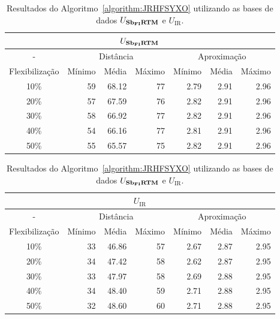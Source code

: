 \begin{table}[!htb]
  \caption{Resultados do Algoritmo~\ref{algorithm:JRHFSYXO} utilizando as bases de dados $U_{\textbf{Sb\textsubscript{FI}RTM}}{}$ e $U_{\text{IR}}$.}
  \label{table:NKDEXOVQ}
  \centering
  \begin{tabular}{|c|r|r|r|r|r|r|}
    \hline
    \multicolumn{7}{|c|}{$U_{\textbf{Sb\textsubscript{FI}RTM}}{}$}                                                                     \\ \hline
      -            & \multicolumn{3}{c|}{Distância}             & \multicolumn{3}{c|}{Aproximação}           \\ \hline
    Flexibilização & Mínimo       & Média        & Máximo       & Mínimo       & Média        & Máximo       \\ \hline  
    10\%           & 59           & 68.12        & 77           & 2.79         & 2.91         & 2.96         \\ \hline
    20\%           & 57           & 67.59        & 76           & 2.82         & 2.91         & 2.96         \\ \hline
    30\%           & 58           & 66.92        & 77           & 2.82         & 2.91         & 2.96         \\ \hline
    40\%           & 54           & 66.16        & 77           & 2.81         & 2.91         & 2.96         \\ \hline
    50\%           & 55           & 65.57        & 75           & 2.82         & 2.91         & 2.96         \\ \hline    
  \end{tabular}

  \vspace{5mm}

  \begin{tabular}{|c|r|r|r|r|r|r|}
    \hline
    \multicolumn{7}{|c|}{$U_{\text{IR}}$}                                                                    \\ \hline
      -            & \multicolumn{3}{c|}{Distância}             & \multicolumn{3}{c|}{Aproximação}           \\ \hline
    Flexibilização & Mínimo       & Média        & Máximo       & Mínimo       & Média        & Máximo       \\ \hline  
    10\%           & 33           & 46.86        & 57           & 2.67         & 2.87         & 2.95         \\ \hline
    20\%           & 34           & 47.42        & 58           & 2.62         & 2.87         & 2.95         \\ \hline
    30\%           & 33           & 47.97        & 58           & 2.69         & 2.88         & 2.95         \\ \hline
    40\%           & 34           & 48.40        & 59           & 2.71         & 2.88         & 2.95         \\ \hline
    50\%           & 32           & 48.60        & 60           & 2.71         & 2.88         & 2.95         \\ \hline    
  \end{tabular}
\end{table}

